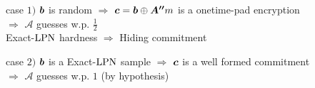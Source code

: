 \begin{frame}
\begin{overprint}
 \begin{center}\end{center}
 \begin{center}\end{center}
 \begin{center}\end{center}
 \begin{center}\end{center} 
 \begin{center}\end{center}
 \begin{center}\end{center}
 \end{overprint}
 
 \begin{overprint}
\begin{block}{case $1)$  }
$\boldsymbol{b}$ is random $\Rightarrow$ $\boldsymbol{c} = \boldsymbol{b} \mathbin{\oplus} \boldsymbol{A''}m$ is a \alert{onetime-pad} encryption\\
$\Rightarrow$ $\mathcal{A}$ guesses w.p. $\frac{1}{2}$\\
\centering Exact-$\mathrm{LPN}$ hardness $\Rightarrow$ Hiding commitment
\end{block}

\begin{block}{case $2)$  }
$\boldsymbol{b}$ is a Exact-$\mathrm{LPN}$ sample $\Rightarrow$ $\boldsymbol{c}$ is a well formed commitment\\
\centering $\Rightarrow$ $\mathcal{A}$ guesses w.p. $1$ (by hypothesis)\\
\end{block}

\end{overprint}

\end{frame}

